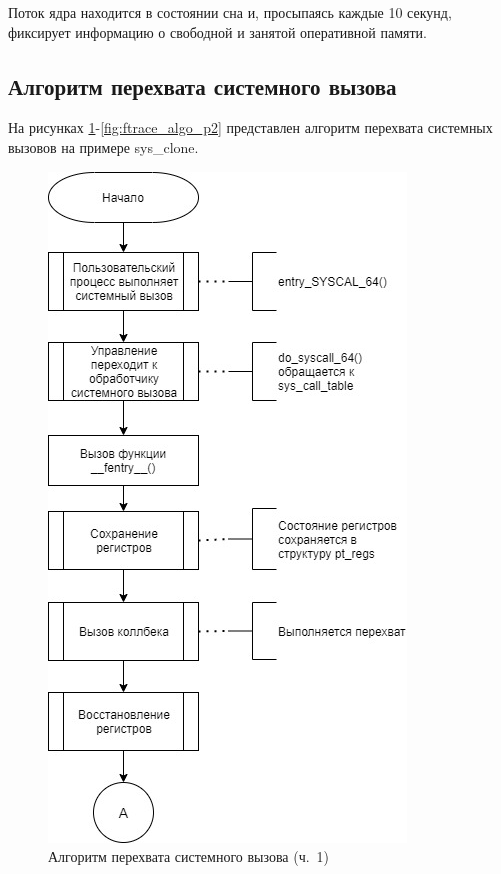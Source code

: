 Поток ядра находится в состоянии сна и, просыпаясь каждые 10 секунд, фиксирует информацию о свободной и занятой оперативной памяти.

\subsection{Алгоритм перехвата системного вызова}

На рисунках \ref{fig:ftrace_algo_p1}-\ref{fig:ftrace_algo_p2} представлен алгоритм перехвата системных вызовов на примере sys\_clone.

\begin{figure}[h]
	\begin{center}
		\includegraphics[scale=0.6]{jpg/ftrace_algo-Page-1.jpg}
	\end{center}
	\caption{Алгоритм перехвата системного вызова (ч.~1)}
	\label{fig:ftrace_algo_p1}
\end{figure}

